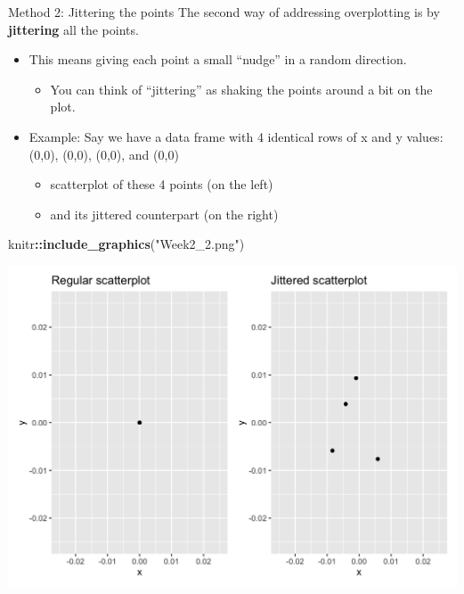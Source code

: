 \documentclass[
  ignorenonframetext,
]{beamer}
\newenvironment{Shaded}{\begin{snugshade}}{\end{snugshade}}
\newcommand{\FunctionTok}[1]{\textcolor[rgb]{0.13,0.29,0.53}{\textbf{#1}}}
\newcommand{\NormalTok}[1]{#1}
\newcommand{\SpecialCharTok}[1]{\textcolor[rgb]{0.81,0.36,0.00}{\textbf{#1}}}
\newcommand{\StringTok}[1]{\textcolor[rgb]{0.31,0.60,0.02}{#1}}
\providecommand{\tightlist}{%
  \setlength{\itemsep}{0pt}\setlength{\parskip}{0pt}}
\begin{document}
\begin{frame}[fragile]{Method 2: Jittering the points}
\protect\hypertarget{method-2-jittering-the-points}{}
The second way of addressing overplotting is by \textbf{jittering} all
the points.

\begin{itemize}
\item
  This means giving each point a small ``nudge'' in a random direction.

  \begin{itemize}
  \tightlist
  \item
    You can think of ``jittering'' as shaking the points around a bit on
    the plot.
  \end{itemize}
\item
  Example: Say we have a data frame with 4 identical rows of x and y
  values: (0,0), (0,0), (0,0), and (0,0)

  \begin{itemize}
  \tightlist
  \item
    scatterplot of these 4 points (on the left)
  \item
    and its jittered counterpart (on the right)
  \end{itemize}
\end{itemize}

\tiny

\begin{Shaded}
\begin{Highlighting}[]
\NormalTok{knitr}\SpecialCharTok{::}\FunctionTok{include\_graphics}\NormalTok{(}\StringTok{"Week2\_2.png"}\NormalTok{)}
\end{Highlighting}
\end{Shaded}

\begin{center}\includegraphics[width=0.7\linewidth,height=0.3\textheight]{Week2_2} \end{center}
\normalsize
\end{frame}
\end{document}
